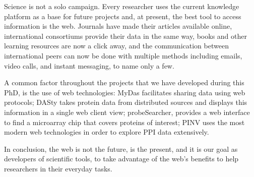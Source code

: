 Science is not a solo campaign. Every researcher uses the current knowledge platform as a base for future projects and, at present, the best tool to access information is the web. Journals have made their articles available online, international consortiums provide their data in the same way, books and other learning resources are now a click away, and the communication between international peers can now be done with multiple methods including emails, video calls, and instant messaging, to name only a few.

A common factor throughout the projects that we have developed during this PhD, is the use of web technologies: MyDas facilitates sharing data using web protocols; DASty takes protein data from distributed sources and displays this information in a single web client view; probeSearcher, provides a web interface to find a microarray chip that covers proteins of interest; PINV uses the most modern web technologies in order to explore PPI data extensively. 

In conclusion, the web is not the future, is the present, and it is our goal as developers of scientific tools, to take advantage of the web's benefits to help researchers in their everyday tasks.

